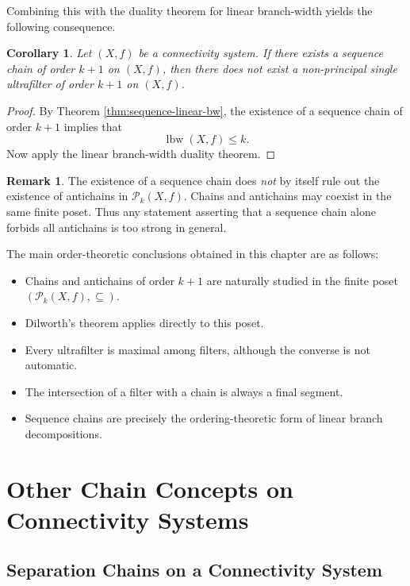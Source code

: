 \documentclass[10pt]{book}
\newtheorem{corollary}[theorem]{Corollary}
\theoremstyle{definition}
\newtheorem{remark}[theorem]{Remark}
\begin{document}
Combining this with the duality theorem for linear branch-width yields the following consequence.

\begin{corollary}
\label{cor:sequence-no-single-ultrafilter}
Let \((X,f)\) be a connectivity system.
If there exists a sequence chain of order \(k+1\) on \((X,f)\), then there does not exist a non-principal single ultrafilter of order \(k+1\) on \((X,f)\).
\end{corollary}

\begin{proof}
By Theorem \ref{thm:sequence-linear-bw}, the existence of a sequence chain of order \(k+1\) implies that
\[
\operatorname{lbw}(X,f)\leq k.
\]
Now apply the linear branch-width duality theorem.
\end{proof}

\begin{remark}
The existence of a sequence chain does \emph{not} by itself rule out the existence of antichains in \(\mathcal{P}_k(X,f)\).
Chains and antichains may coexist in the same finite poset.
Thus any statement asserting that a sequence chain alone forbids all antichains is too strong in general.
\end{remark}

The main order-theoretic conclusions obtained in this chapter are as follows:
\begin{itemize}
    \item Chains and antichains of order \(k+1\) are naturally studied in the finite poset \((\mathcal{P}_k(X,f),\subseteq)\).
    \item Dilworth's theorem applies directly to this poset.
    \item Every ultrafilter is maximal among filters, although the converse is not automatic.
    \item The intersection of a filter with a chain is always a final segment.
    \item Sequence chains are precisely the ordering-theoretic form of linear branch decompositions.
\end{itemize}
\section{Other Chain Concepts on Connectivity Systems}

\subsection{Separation Chains on a Connectivity System}
\end{document}
